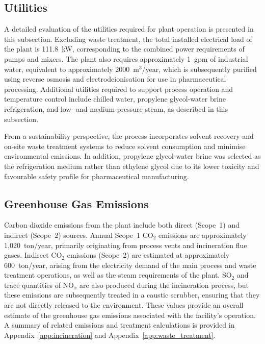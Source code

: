 \subsection{Utilities}
\label{sec:utilities}

A detailed evaluation of the utilities required for plant operation is presented in this subsection. Excluding waste treatment, the total installed electrical load of the plant is 111.8~kW, corresponding to the combined power requirements of pumps and mixers. The plant also requires approximately 1~gpm of industrial water, equivalent to approximately 2000~m$^3$/year, which is subsequently purified using reverse osmosis and electrodeionisation for use in pharmaceutical processing. Additional utilities required to support process operation and temperature control include chilled water, propylene glycol-water brine refrigeration, and low- and medium-pressure steam, as described in this subsection.

From a sustainability perspective, the process incorporates solvent recovery and on-site waste treatment systems to reduce solvent consumption and minimise environmental emissions. In addition, propylene glycol-water brine was selected as the refrigeration medium rather than ethylene glycol due to its lower toxicity and favourable safety profile for pharmaceutical manufacturing.

\subsection{Greenhouse Gas Emissions}
\label{sec:ghg_emissions}

Carbon dioxide emissions from the plant include both direct (Scope~1) and indirect (Scope~2) sources. Annual Scope~1 CO$_2$ emissions are approximately 1,020~ton/year, primarily originating from process vents and incineration flue gases. Indirect CO$_2$ emissions (Scope~2) are estimated at approximately 600~ton/year, arising from the electricity demand of the main process and waste treatment operations, as well as the steam requirements of the plant. SO$_2$ and trace quantities of NO$_x$ are also produced during the incineration process, but these emissions are subsequently treated in a caustic scrubber, ensuring that they are not directly released to the environment. These values provide an overall estimate of the greenhouse gas emissions associated with the facility's operation. A summary of related emissions and treatment calculations is provided in Appendix~\ref{app:incineration} and Appendix~\ref{app:waste_treatment}.

